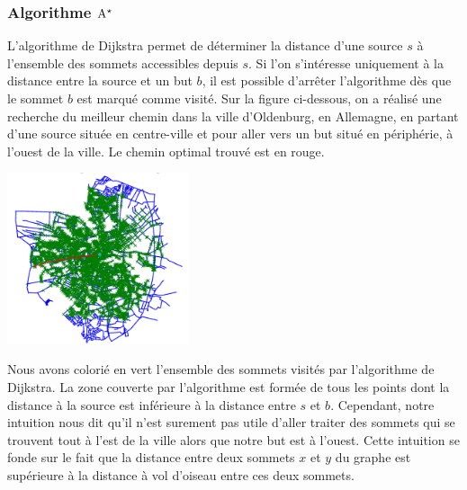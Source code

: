 \documentclass{magnolia}
\begin{document}
\subsubsection{Algorithme ${\rm A}^\star$}

L'algorithme de Dijkstra permet de déterminer la distance d'une source $s$ à
l'ensemble des sommets accessibles depuis $s$. Si l'on s'intéresse uniquement à la
distance entre la source et un but $b$, il est possible d'arrêter l'algorithme dès que
le sommet $b$ est
marqué comme visité. Sur la figure ci-dessous, on a réalisé une recherche du meilleur
chemin dans la ville d'Oldenburg, en Allemagne, en partant d'une source située en centre-ville et pour aller vers un but situé en périphérie, à l'ouest de la ville. Le chemin optimal trouvé est en rouge.

\begin{center}
\includegraphics[width=0.4\textwidth]{../../Commun/Images/python-cours-graphe-astar-1.png}
\end{center}

Nous avons colorié en vert l'ensemble des sommets \og visités \fg par l'algorithme de
Dijkstra. La zone couverte par l'algorithme est formée de tous les points dont
la distance à la source est inférieure à la distance entre $s$ et $b$. Cependant, notre
intuition nous dit qu'il n'est surement pas utile d'aller traiter des sommets qui se
trouvent tout à l'est de la ville alors que notre but est à l'ouest. Cette intuition
se fonde sur le fait que la distance entre deux sommets $x$ et $y$ du graphe est
supérieure à la distance à vol d'oiseau entre ces deux sommets.\\
\end{document}
